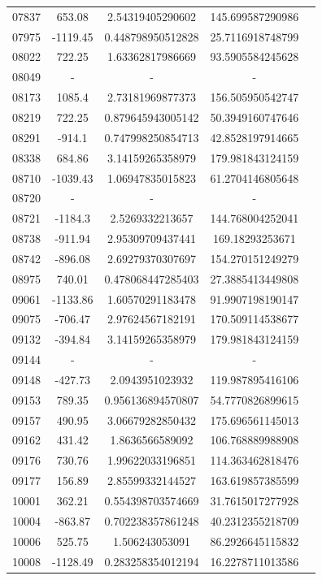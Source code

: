 {\begin{longtable}{ccccc}
07837 & 653.08 & 2.54319405290602 & 145.699587290986 \\
07975 & -1119.45 & 0.448798950512828 & 25.7116918748799 \\
08022 & 722.25 & 1.63362817986669 & 93.5905584245628 \\
08049 & - & - &  -  \\
08173 & 1085.4 & 2.73181969877373 & 156.505950542747 \\
08219 & 722.25 & 0.879645943005142 & 50.3949160747646 \\
08291 & -914.1 & 0.747998250854713 & 42.8528197914665 \\
08338 & 684.86 & 3.14159265358979 & 179.981843124159 \\
08710 & -1039.43 & 1.06947835015823 & 61.2704146805648 \\
08720 & - & - &  -  \\
08721 & -1184.3 & 2.5269332213657 & 144.768004252041 \\
08738 & -911.94 & 2.95309709437441 & 169.18293253671 \\
08742 & -896.08 & 2.69279370307697 & 154.270151249279 \\
08975 & 740.01 & 0.478068447285403 & 27.3885413449808 \\
09061 & -1133.86 & 1.60570291183478 & 91.9907198190147 \\
09075 & -706.47 & 2.97624567182191 & 170.509114538677 \\
09132 & -394.84 & 3.14159265358979 & 179.981843124159 \\
09144 & - & - & - \\
09148 & -427.73 & 2.0943951023932 & 119.987895416106 \\
09153 & 789.35 & 0.956136894570807 & 54.7770826899615 \\
09157 & 490.95 & 3.06679282850432 & 175.696561145013 \\
09162 & 431.42 & 1.8636566589092 & 106.768889988908 \\
09176 & 730.76 & 1.99622033196851 & 114.363462818476 \\
09177 & 156.89 & 2.85599332144527 & 163.619857385599 \\
10001 & 362.21 & 0.554398703574669 & 31.7615017277928 \\
10004 & -863.87 & 0.702238357861248 & 40.2312355218709 \\
10006 & 525.75 & 1.506243053091 & 86.2926645115832 \\
10008 & -1128.49 & 0.283258354012194 & 16.2278711013586 \\

\end{longtable}}
